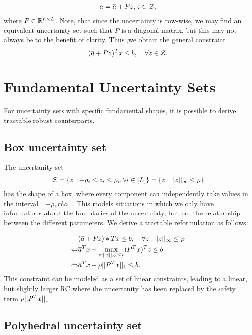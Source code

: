 \begin{align*}
a = \overline{ a } + Pz, z\in\mathcal{Z},
\end{align*}
where $P\in\mathbb{R}^{n\times L}$. Note, that since the uncertainty is row-wise, we may find an equivalent uncertainty set such that $P$ is a diagonal matrix, but this may not always be to the benefit of clarity. Thus ,we obtain the general constraint
\begin{align*}
(\overline{ a }+Pz)^Tx\leq b, \quad \forall z\in\mathcal{Z}.
\end{align*}

\section{Fundamental Uncertainty Sets}

For uncertainty sets with specific fundamental shapes, it is possible to derive tractable robust counterparts.

\subsection{Box uncertainty set}

The uncertanity set
\begin{align*}
	\mathcal{Z} = \{z\mid -\rho_i\leq z_i\leq\rho_i, \forall i\in[L]\} = \{z\mid ||z||_\infty\leq\rho\}
\end{align*}
has the shape of  a box, where every component can independently take values in the interval $[-\rho,rho]$. This models situations in which we only have informations about the boundaries of the uncertainty, but not the relationship between the different parameters.
We derive a tractable reformulation as follows:

\begin{align*}
 & (\overline{ a }+Pz)*Tx\leq b, \quad\forall z: \vert\vert z \vert\vert_\infty\leq\rho \\
 \Leftrightarrow & \overline{ a }^Tx+\max\limits_{z:\vert\vert z \vert\vert_\infty\leq\rho} (P^Tx)^Tz\leq b \\
 \Leftrightarrow & \overline{ a }^Tx+\rho\vert\vert P^Tx \vert\vert_1 \leq b.
\end{align*}
This constraint can be modeled as a set of linear constraints, leading to a linear, but slightly larger RC where the uncertanity has been replaced by the safety term $\rho\vert\vert P^Tx \vert\vert_1$.

\subsection{Polyhedral uncertainty set}


